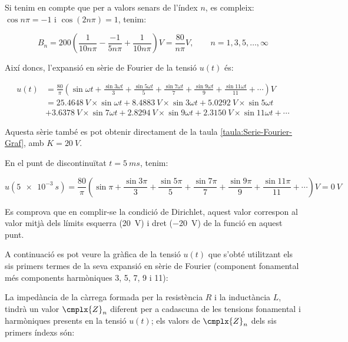 \begin{exemple}
    Si tenim en compte que per a valors senars de l'índex $n$, es
    compleix: $\cos n \pi = -1$ i $\cos (2 n \pi) = 1$, tenim:

    \[
        B_n = 200 \left( \frac{1}{10 n \pi} - \frac{-1}{5 n \pi} +
        \frac{1}{10 n \pi} \right) \unit{V} = \frac{80}{n \pi} \unit{V},
        \qquad n=1,3,5,\ldots,\infty
    \]

    Així doncs, l'expansió en sèrie de Fourier de la tensió $u(t)$ és:

    \[\begin{split}
        u(t) &= \frac{80}{\pi} \left( \sin \omega t + \frac{\sin 3 \omega t}{3} +
        \frac{\sin 5 \omega t}{5} + \frac{\sin 7 \omega t}{7} +
        \frac{\sin 9 \omega t}{9} + \frac{\sin 11 \omega t}{11} +\cdots\right) \unit{V}\\
        &= \qty{25,4648}{V} \times \sin \omega t + \qty{8,4883}{V} \times \sin 3 \omega t + \qty{5,0292}{V} \times \sin 5 \omega t \\
        &+ \qty{3,6378}{V} \times \sin 7 \omega t + \qty{2,8294}{V} \times \sin 9 \omega t + \qty{2,3150}{V} \times \sin 11 \omega t +\cdots
    \end{split}\]

  
    Aquesta sèrie també es pot obtenir directament de la taula \vref{taula:Serie-Fourier-Graf}, amb $K=\qty{20}{V}$.

    En el punt de discontinuïtat $t=\qty{5}{ms}$, tenim:

    \[
        u(\qty{5e-3}{s}) =\frac{80}{\pi} \left( \sin \pi + \frac{\sin 3 \pi}{3} +
        \frac{\sin 5 \pi}{5} + \frac{\sin 7 \pi}{7} +
        \frac{\sin 9 \pi}{9} +\frac{\sin 11 \pi}{11}+\cdots\right) \unit{V}= \qty{0}{V}
    \]

    Es comprova que en complir-se la condició de Dirichlet, aquest valor
    correspon al valor mitjà dels límits esquerra (\qty{20}{V}) i dret (\qty{-20}{V})  de
    la funció en aquest punt.

    A continuació es pot veure la gràfica de la tensió $u(t)$ que
    s'obté utilitzant els sis primers termes de la seva expansió en sèrie de Fourier (component fonamental més components harmòniques 3, 5, 7, 9 i 11):

    \begin{center}
        
    \end{center}

    La impedància de la càrrega formada per la resistència $R$ i la
    inductància $L$, tindrà un valor $\cmplx{Z}_n$ diferent per a
    cadascuna de les tensions fonamental i harmòniques presents en la
    tensió $u(t)$; els valors de $\cmplx{Z}_n$ dels sis primers índexs són:
    

\end{exemple}

